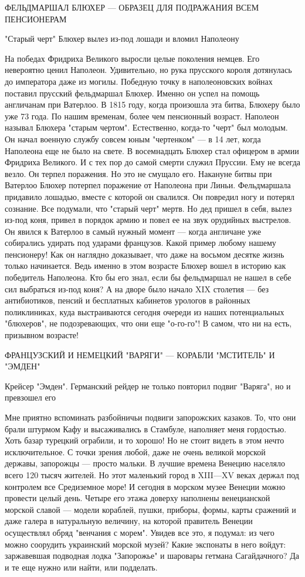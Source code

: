 ФЕЛЬДМАРШАЛ БЛЮХЕР — ОБРАЗЕЦ ДЛЯ ПОДРАЖАНИЯ ВСЕМ ПЕНСИОНЕРАМ 

"Старый черт" Блюхер вылез из-под лошади и вломил Наполеону

На победах Фридриха Великого выросли целые поколения немцев. Его невероятно
ценил Наполеон. Удивительно, но рука прусского короля дотянулась до императора
даже из могилы. Победную точку в наполеоновских войнах поставил прусский
фельдмаршал Блюхер. Именно он успел на помощь англичанам при Ватерлоо. В 1815
году, когда произошла эта битва, Блюхеру было уже 73 года. По нашим временам,
более чем пенсионный возраст. Наполеон называл Блюхера "старым чертом".
Естественно, когда-то "черт" был молодым. Он начал военную службу совсем юным
"чертенком" — в 14 лет, когда Наполеона еще не было на свете. В восемнадцать
Блюхер стал офицером в армии Фридриха Великого. И с тех пор до самой смерти
служил Пруссии. Ему не всегда везло. Он терпел поражения. Но это не смущало
его. Накануне битвы при Ватерлоо Блюхер потерпел поражение от Наполеона при
Линьи. Фельдмаршала придавило лошадью, вместе с которой он свалился. Он
повредил ногу и потерял сознание. Все подумали, что "старый черт" мертв. Но дед
пришел в себя, вылез из-под коня, привел в порядок армию и повел ее на звук
орудийных выстрелов. Он явился к Ватерлоо в самый нужный момент — когда
англичане уже собирались удирать под ударами французов. Какой пример любому
нашему пенсионеру! Как он наглядно доказывает, что даже на восьмом десятке
жизнь только начинается. Ведь именно в этом возрасте Блюхер вошел в историю как
победитель Наполеона. Кто бы его знал, если бы фельдмаршал не нашел в себе сил
выбраться из-под коня? А на дворе было начало XIX столетия — без антибиотиков,
пенсий и бесплатных кабинетов урологов в районных поликлиниках, куда
выстраиваются сегодня очереди из наших потенциальных "блюхеров", не
подозревающих, что они еще "о-го-го"! В самом, что ни на есть, призывном
возрасте!

ФРАНЦУЗСКИЙ И НЕМЕЦКИЙ "ВАРЯГИ" — КОРАБЛИ "МСТИТЕЛЬ" И "ЭМДЕН" 

Крейсер "Эмден". Германский рейдер не только повторил подвиг "Варяга", но и
превзошел его

Мне приятно вспоминать разбойничьи подвиги запорожских казаков. То, что они
брали штурмом Кафу и высаживались в Стамбуле, наполняет меня гордостью. Хоть
базар турецкий ограбили, и то хорошо! Но не стоит видеть в этом нечто
исключительное. С точки зрения любой, даже не очень великой морской державы,
запорожцы — просто мальки. В лучшие времена Венецию населяло всего 120 тысяч
жителей. Но этот маленький город в XIII—XV веках держал под контролем все
Средиземное море! И сегодня в морском музее Венеции можно провести целый день.
Четыре его этажа доверху наполнены венецианской морской славой — модели
кораблей, пушки, приборы, формы, карты сражений и даже галера в натуральную
величину, на которой правитель Венеции осуществлял обряд "венчания с морем".
Увидев все это, я подумал: из чего можно соорудить украинский морской музей?
Какие экспонаты в него войдут: заржавевшая подводная лодка "Запорожье" и
шаровары гетмана Сагайдачного? Да и те еще нужно или найти, или подделать.

